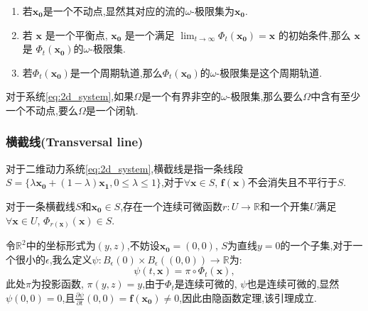 \begin{exmp}

    \begin{enumerate}
        \item 若$\mathbf{x_0}$是一个不动点,显然其对应的流的$\omega$-极限集为$\mathbf{x_0}$. 
        \item 若 $\mathbf{x}$ 是一个平衡点, $\mathbf{x_0}$ 是一个满足 $\lim_{t\to\infty}\Phi_t(\mathbf{x_0}) = \mathbf{x}$ 的初始条件,那么 $\mathbf{x}$ 是 $\Phi_t(\mathbf{x_0})$的$\omega$-极限集. 
        \item 若$\Phi_t(\mathbf{x_0})$是一个周期轨道,那么$\Phi_t(\mathbf{x_0})$的$\omega$-极限集是这个周期轨道. 
    \end{enumerate}
\end{exmp}
\begin{thm}\cite{coddington1956theory}

    对于系统\ref{eq:2d_system},如果$\Omega$是一个有界非空的$\omega$-极限集,那么要么$\Omega$中含有至少一个不动点,要么$\Omega$是一个闭轨. 
\end{thm}
\subsubsection{横截线(Transversal line)}
\begin{defn}[横截线]\cite{coddington1956theory}
    对于二维动力系统\ref{eq:2d_system},横截线是指一条线段$S=\{\lambda\mathbf{x_0}+(1-\lambda)\mathbf{x_1},0\leq \lambda\leq 1\}$,对于$\forall \mathbf{x}\in S$, $\mathbf{f}(\mathbf{x})$不会消失且不平行于$S$. 
\end{defn}
\begin{lem}\label{lem:transversal}\cite{coddington1956theory}
对于一条横截线$S$和$\mathbf{x_0}\in S$,存在一个连续可微函数$r:U\to\mathbb{R}$和一个开集$U$满足$\forall \mathbf{x}\in U$, $\Phi_{r(\mathbf{x})}(\mathbf{x})\in S$. 
\end{lem}
\begin{pf}
    令$\mathbb{R}^2$中的坐标形式为$(y,z)$,不妨设$\mathbf{x_0}=(0,0)$, $S$为直线$y=0$的一个子集,对于一个很小的$\epsilon$,我么定义$\psi:B_{\epsilon}(0)\times B_{\epsilon}((0,0))\to \mathbb{R}$为:
    \begin{equation}
        \psi(t,\mathbf{x})=\pi\circ\Phi_t(\mathbf{x}),
    \end{equation}
    此处$\pi$为投影函数, $\pi(y,z)=y$,由于$\Phi_t$是连续可微的, $\psi$也是连续可微的,显然$\psi(0,0)=0$,且$\frac{\partial \psi}{\partial t}(0,0)=\mathbf{f}(\mathbf{x_0})\neq 0$,因此由隐函数定理,该引理成立. 
\end{pf}

